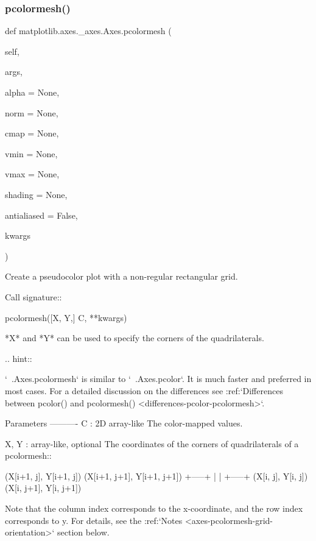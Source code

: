 \begin{DoxyVerb}
\subsubsection{\texorpdfstring{pcolormesh()}{pcolormesh()}}
{\footnotesize\ttfamily def matplotlib.\+axes.\+\_\+axes.\+Axes.\+pcolormesh (\begin{DoxyParamCaption}\item[{}]{self,  }\item[{}]{args,  }\item[{}]{alpha = {\ttfamily None},  }\item[{}]{norm = {\ttfamily None},  }\item[{}]{cmap = {\ttfamily None},  }\item[{}]{vmin = {\ttfamily None},  }\item[{}]{vmax = {\ttfamily None},  }\item[{}]{shading = {\ttfamily None},  }\item[{}]{antialiased = {\ttfamily False},  }\item[{}]{kwargs }\end{DoxyParamCaption})}

\begin{DoxyVerb}Create a pseudocolor plot with a non-regular rectangular grid.

Call signature::

    pcolormesh([X, Y,] C, **kwargs)

*X* and *Y* can be used to specify the corners of the quadrilaterals.

.. hint::

   `~.Axes.pcolormesh` is similar to `~.Axes.pcolor`. It is much faster
   and preferred in most cases. For a detailed discussion on the
   differences see :ref:`Differences between pcolor() and pcolormesh()
   <differences-pcolor-pcolormesh>`.

Parameters
----------
C : 2D array-like
    The color-mapped values.

X, Y : array-like, optional
    The coordinates of the corners of quadrilaterals of a pcolormesh::

(X[i+1, j], Y[i+1, j])       (X[i+1, j+1], Y[i+1, j+1])
                      +-----+
                      |     |
                      +-----+
    (X[i, j], Y[i, j])       (X[i, j+1], Y[i, j+1])

    Note that the column index corresponds to the x-coordinate, and
    the row index corresponds to y. For details, see the
    :ref:`Notes <axes-pcolormesh-grid-orientation>` section below.


\end{DoxyVerb}
\end{DoxyVerb}
